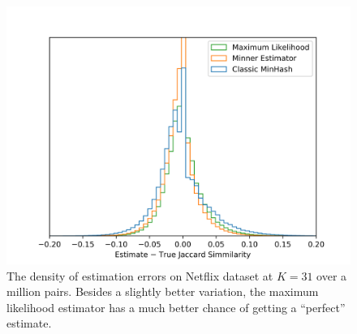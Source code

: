 \begin{figure}
   \centering
   \includegraphics[trim=0 5 35 40,clip,width=\linewidth]{figures/hist2}
\caption{The density of estimation errors on Netflix dataset at $K=31$ over a million pairs.
Besides a slightly better variation, the maximum likelihood estimator has a much better chance of getting a ``perfect'' estimate.
}
\end{figure}

